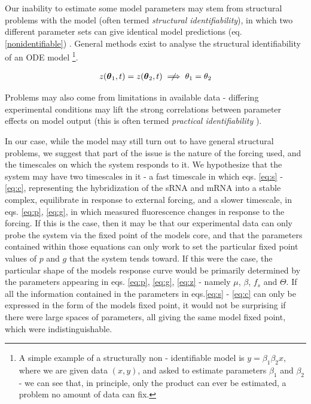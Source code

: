 \documentclass[10pt,journal]{./IEEE_latex_class/IEEEtran}
\begin{document}
Our inability to estimate some model parameters may stem from structural problems with the model (often termed \textit{structural identifiability}), in which two different parameter sets can give identical model predictions (eq. \ref{nonidentifiable}) . General methods exist to analyse the structural identifiability of an ODE model \cite{Jimenez-Hornero2008,Grewal1976 } \footnote{A simple example of a structurally non - identifiable model is $y = \beta_{1}\beta_{2}x$, where we are given data $(x,y)$, and asked to estimate parameters $\beta_{1}$ and $\beta_{2}$ - we can see that, in principle, only the product can ever be estimated, a problem no amount of data can fix.}. 

 \begin{align}
z(\boldsymbol{\theta}_{1},t) = z(\boldsymbol{\theta}_{2},t) \centernot\implies \theta_{1} = \theta_{2}
\label{nonidentifiable}
\end{align}


Problems may also come from limitations in available data - differing experimental conditions may lift the strong correlations between parameter effects on model output (this is often termed \textit{practical identifiability} \cite{Mclean2012}). 

In our case, while the model may still turn out to have general structural problems, we suggest that part of the issue is the nature of the forcing used, and the timescales on which the system responds to it. We hypothesize that the system may have two timescales in it - a fast timescale in which eqs. \ref{eq:s} - \ref{eq:c}, representing the hybridization of the sRNA and mRNA into a stable complex, equilibrate in response to external forcing, and a slower timescale, in eqs. \ref{eq:p}, \ref{eq:g}, in which measured fluorescence changes in response to the forcing. If this is the case, then it may be that our experimental data can only probe the system via the fixed point of the models core, and that the parameters contained within those equations can only work to set the particular fixed point values of $p$ and $g$ that the system tends toward. If this were the case, the particular shape of the models response curve would be primarily determined by the parameters appearing in eqs. \ref{eq:p}, \ref{eq:g}, \ref{eq:z} - namely $\mu$, $\beta$, $f_{s}$ and $\Theta$. If all the information contained in the parameters in eqs.\ref{eq:s} - \ref{eq:c} can only be expressed in the form of the models fixed point, it would not be surprising if there were large spaces of parameters, all giving the same model fixed point, which were indistinguishable. 
\end{document}
